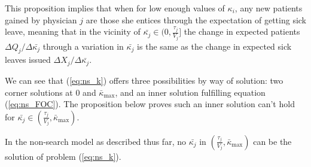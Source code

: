 \documentclass[../main.tex]{subfiles}
\begin{document}
This proposition implies that when for low enough values of $\kappa_i$, any new patients gained by physician $j$ are those she entices through the expectation of getting sick leave, meaning that in the vicinity of $\bar{\kappa_j} \in (0,\frac{\tau_j}{V_j}]$ the change in expected patients $\Delta Q_j/\Delta\bar{\kappa_j}$ through a variation in $\bar{\kappa_j}$ is the same as the change in expected sick leaves issued $\Delta X_j/\Delta \bar{\kappa_j}$.

We can see that (\ref{eq:ns_k}) offers three possibilities by way of solution: two corner solutions at 0 and $\bar{\kappa}_{\max}$, and an inner solution fulfilling equation (\ref{eq:ns_FOC}). The proposition below proves such an inner solution can't hold for $\bar{\kappa_j} \in (\frac{\tau_j}{V_j}, \bar{\kappa}_{\max})$.  

\begin{prop}
    \label{ns_prop2}
In the non-search model as described thus far, no $\bar{\kappa_j}$ in $(\frac{\tau_j}{V_j}, \bar{\kappa}_{\max})$ can be the solution of problem (\ref{eq:ns_k}).
\end{prop}
\end{document}
